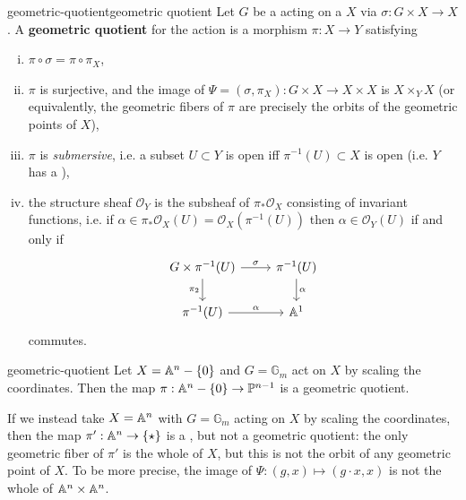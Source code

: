 \begin{topic}{geometric-quotient}{geometric quotient}
    Let $G$ be a  acting on a  $X$ via $\sigma : G \times X \to X$. A \textbf{geometric quotient} for the action is a morphism $\pi : X \to Y$ satisfying
    \begin{enumerate}[(i)]
        \item $\pi \circ \sigma = \pi \circ \pi_X$,
        \item $\pi$ is surjective, and the image of $\Psi = (\sigma, \pi_X) : G \times X \to X \times X$ is $X \times_Y X$ (or equivalently, the geometric fibers of $\pi$ are precisely the orbits of the geometric points of $X$),
        \item $\pi$ is \textit{submersive}, i.e. a subset $U \subset Y$ is open iff $\pi^{-1}(U) \subset X$ is open (i.e. $Y$ has a ),
        \item the structure sheaf $\mathcal{O}_Y$ is the subsheaf of $\pi_* \mathcal{O}_X$ consisting of invariant functions, i.e. if $\alpha \in \pi_* \mathcal{O}_X(U) = \mathcal{O}_X(\pi^{-1}(U))$ then $\alpha \in \mathcal{O}_Y(U)$ if and only if
        \[ \begin{tikzcd} G \times \pi^{-1}(U) \arrow{r}{\sigma} \arrow[swap]{d}{\pi_2} & \pi^{-1}(U) \arrow{d}{\alpha} \\ \pi^{-1}(U) \arrow{r}{\alpha} & \AA^1 \end{tikzcd} \]
        commutes.
    \end{enumerate}
\end{topic}

\begin{example}{geometric-quotient}
    Let $X = \AA^n - \{ 0 \}$ and $G = \mathbb{G}_m$ act on $X$ by scaling the coordinates. Then the map $\pi : \AA^n - \{ 0 \} \to \PP^{n - 1}$ is a geometric quotient.
    
    If we instead take $X = \AA^n$ with $G = \mathbb{G}_m$ acting on $X$ by scaling the coordinates, then the map $\pi' : \AA^n \to \{ \star \}$ is a , but not a geometric quotient: the only geometric fiber of $\pi'$ is the whole of $X$, but this is not the orbit of any geometric point of $X$. To be more precise, the image of $\Psi : (g, x) \mapsto (g \cdot x, x)$ is not the whole of $\AA^n \times \AA^n$.
\end{example}

